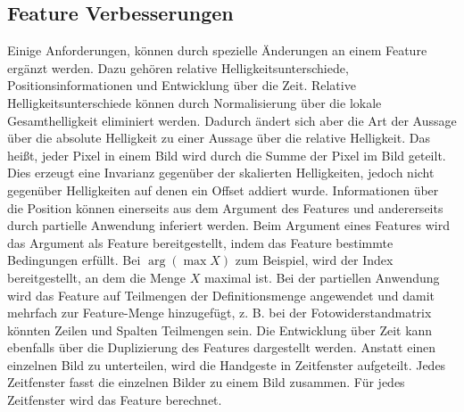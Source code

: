 \subsection{Feature Verbesserungen}
Einige Anforderungen, können durch spezielle Änderungen an einem Feature ergänzt werden. Dazu gehören relative Helligkeitsunterschiede, Positionsinformationen und Entwicklung über die Zeit.
\newline
\newline
Relative Helligkeitsunterschiede können durch Normalisierung über die lokale Gesamthelligkeit eliminiert werden. Dadurch ändert sich aber die Art der Aussage über die absolute Helligkeit
zu einer Aussage über die relative Helligkeit. Das heißt, jeder Pixel in einem Bild wird durch die Summe der Pixel im Bild geteilt. Dies erzeugt eine Invarianz gegenüber der skalierten Helligkeiten,
jedoch nicht gegenüber Helligkeiten auf denen ein Offset addiert wurde.
\newline
\newline
Informationen über die Position können einerseits aus dem Argument des Features und andererseits durch partielle Anwendung inferiert werden. Beim Argument eines Features wird das Argument als Feature
bereitgestellt, indem das Feature bestimmte Bedingungen erfüllt. Bei $\arg(\max X)$ zum Beispiel, wird der Index bereitgestellt, an dem die Menge $X$ maximal ist. Bei der partiellen Anwendung wird das Feature auf
Teilmengen der Definitionsmenge angewendet und damit mehrfach zur Feature-Menge hinzugefügt, z. B. bei der Fotowiderstandmatrix könnten Zeilen und Spalten Teilmengen sein.
\newline
\newline
Die Entwicklung über Zeit kann ebenfalls über die Duplizierung des Features dargestellt werden. Anstatt einen einzelnen Bild zu unterteilen, wird die Handgeste in Zeitfenster aufgeteilt. Jedes Zeitfenster
fasst die einzelnen Bilder zu einem Bild zusammen. Für jedes Zeitfenster wird das Feature berechnet.